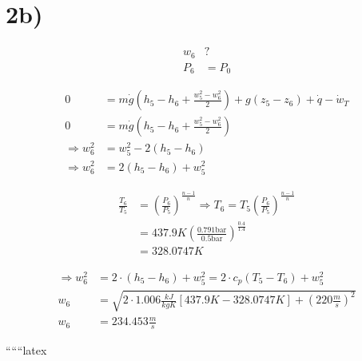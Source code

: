 

\section*{2b)}
\begin{align*}
    w_6 &? \\
    P_6 &= P_0
\end{align*}

\begin{align*}
    0 &= m\dot{g} \left( h_5 - h_6 + \frac{w_5^2 - w_6^2}{2} \right) + g \left( z_5 - z_6 \right) + \dot{q} - \dot{w}_T \\
    0 &= m\dot{g} \left( h_5 - h_6 + \frac{w_5^2 - w_6^2}{2} \right) \\
    \Rightarrow w_6^2 &= w_5^2 - 2(h_5 - h_6) \\
    \Rightarrow w_6^2 &= 2(h_5 - h_6) + w_5^2
\end{align*}

\begin{align*}
    \frac{T_6}{T_5} &= \left( \frac{P_6}{P_5} \right)^{\frac{n-1}{n}} \Rightarrow T_6 = T_5 \left( \frac{P_6}{P_5} \right)^{\frac{n-1}{n}} \\
    &= 437.9K \left( \frac{0.791 \text{bar}}{0.5 \text{bar}} \right)^{\frac{0.4}{1.4}} \\
    &= 328.0747K
\end{align*}

\begin{align*}
    \Rightarrow w_6^2 &= 2 \cdot (h_5 - h_6) + w_5^2 = 2 \cdot c_p (T_5 - T_6) + w_5^2 \\
    w_6 &= \sqrt{2 \cdot 1.006 \frac{kJ}{kgK} \left[ 437.9K - 328.0747K \right] + \left( 220 \frac{m}{s} \right)^2} \\
    w_6 &= 234.453 \frac{m}{s}
\end{align*}

``````latex